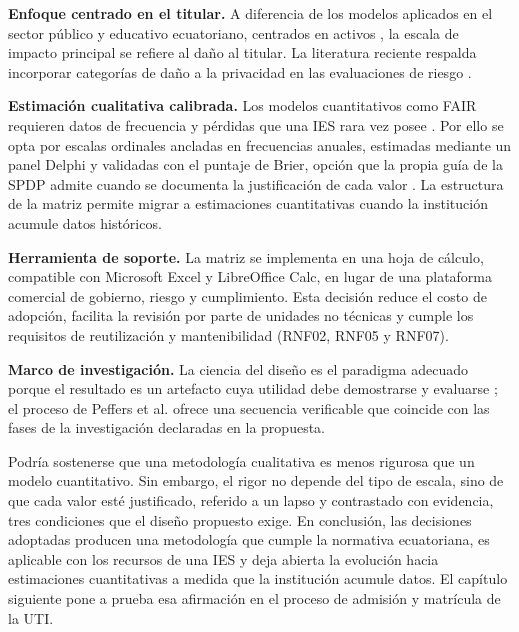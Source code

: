\textbf{Enfoque centrado en el titular.} A diferencia de los modelos aplicados en el sector público y educativo ecuatoriano, centrados en activos \cite{patino2018ict,lopezvasco2025iso}, la escala de impacto principal se refiere al daño al titular. La literatura reciente respalda incorporar categorías de daño a la privacidad en las evaluaciones de riesgo \cite{wairimu2025harm}.

\textbf{Estimación cualitativa calibrada.} Los modelos cuantitativos como FAIR requieren datos de frecuencia y pérdidas que una IES rara vez posee \cite{wang2020fair}. Por ello se opta por escalas ordinales ancladas en frecuencias anuales, estimadas mediante un panel Delphi y validadas con el puntaje de Brier, opción que la propia guía de la SPDP admite cuando se documenta la justificación de cada valor \cite{spdp2026guiav2}. La estructura de la matriz permite migrar a estimaciones cuantitativas cuando la institución acumule datos históricos.

\textbf{Herramienta de soporte.} La matriz se implementa en una hoja de cálculo, compatible con Microsoft Excel y LibreOffice Calc, en lugar de una plataforma comercial de gobierno, riesgo y cumplimiento. Esta decisión reduce el costo de adopción, facilita la revisión por parte de unidades no técnicas y cumple los requisitos de reutilización y mantenibilidad (RNF02, RNF05 y RNF07).

\textbf{Marco de investigación.} La ciencia del diseño es el paradigma adecuado porque el resultado es un artefacto cuya utilidad debe demostrarse y evaluarse \cite{hevner2004design}; el proceso de Peffers et al. \cite{peffers2007dsrm} ofrece una secuencia verificable que coincide con las fases de la investigación declaradas en la propuesta.

Podría sostenerse que una metodología cualitativa es menos rigurosa que un modelo cuantitativo. Sin embargo, el rigor no depende del tipo de escala, sino de que cada valor esté justificado, referido a un lapso y contrastado con evidencia, tres condiciones que el diseño propuesto exige. En conclusión, las decisiones adoptadas producen una metodología que cumple la normativa ecuatoriana, es aplicable con los recursos de una IES y deja abierta la evolución hacia estimaciones cuantitativas a medida que la institución acumule datos. El capítulo siguiente pone a prueba esa afirmación en el proceso de admisión y matrícula de la UTI.
